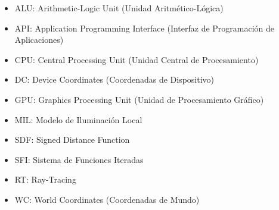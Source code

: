 \begin{itemize}
\item ALU: Arithmetic-Logic Unit (Unidad Aritmético-Lógica)
\item API: Application Programming Interface (Interfaz de Programación de Aplicaciones)
\item CPU: Central Processing Unit (Unidad Central de Procesamiento)
\item DC: Device Coordinates (Coordenadas de Dispositivo)
\item GPU: Graphics Processing Unit (Unidad de Procesamiento Gráfico)
\item MIL: Modelo de Iluminación Local
\item SDF: Signed Distance Function
\item SFI: Sistema de Funciones Iteradas
\item RT: Ray-Tracing
\item WC: World Coordinates (Coordenadas de Mundo)
\end{itemize}